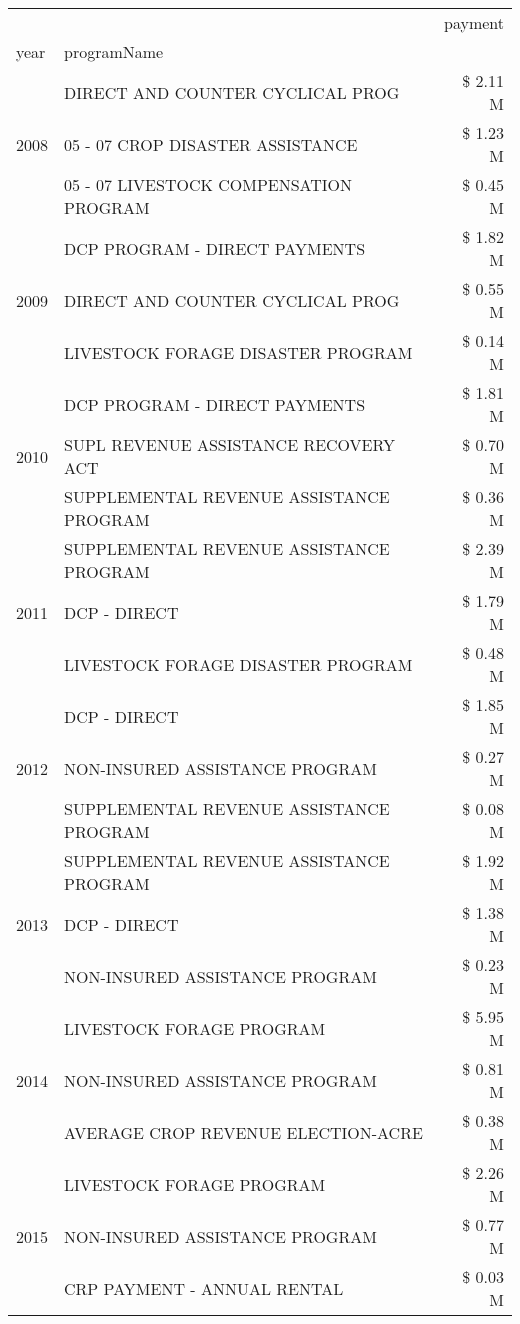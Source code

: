 \begin{tabular}{llr}
\toprule
 &  & payment \\
year & programName &  \\
\midrule
\multirow[t]{3}{*}{2008} & DIRECT AND COUNTER CYCLICAL PROG & \$ 2.11 M \\
 & 05 - 07 CROP DISASTER ASSISTANCE & \$ 1.23 M \\
 & 05 - 07 LIVESTOCK COMPENSATION PROGRAM & \$ 0.45 M \\
\cline{1-3}
\multirow[t]{3}{*}{2009} & DCP PROGRAM - DIRECT PAYMENTS & \$ 1.82 M \\
 & DIRECT AND COUNTER CYCLICAL PROG & \$ 0.55 M \\
 & LIVESTOCK FORAGE DISASTER  PROGRAM & \$ 0.14 M \\
\cline{1-3}
\multirow[t]{3}{*}{2010} & DCP PROGRAM - DIRECT PAYMENTS & \$ 1.81 M \\
 & SUPL REVENUE ASSISTANCE RECOVERY ACT & \$ 0.70 M \\
 & SUPPLEMENTAL REVENUE ASSISTANCE PROGRAM & \$ 0.36 M \\
\cline{1-3}
\multirow[t]{3}{*}{2011} & SUPPLEMENTAL REVENUE ASSISTANCE PROGRAM & \$ 2.39 M \\
 & DCP - DIRECT & \$ 1.79 M \\
 & LIVESTOCK FORAGE DISASTER PROGRAM & \$ 0.48 M \\
\cline{1-3}
\multirow[t]{3}{*}{2012} & DCP - DIRECT & \$ 1.85 M \\
 & NON-INSURED ASSISTANCE PROGRAM & \$ 0.27 M \\
 & SUPPLEMENTAL REVENUE ASSISTANCE PROGRAM & \$ 0.08 M \\
\cline{1-3}
\multirow[t]{3}{*}{2013} & SUPPLEMENTAL REVENUE ASSISTANCE PROGRAM & \$ 1.92 M \\
 & DCP - DIRECT & \$ 1.38 M \\
 & NON-INSURED ASSISTANCE PROGRAM & \$ 0.23 M \\
\cline{1-3}
\multirow[t]{3}{*}{2014} & LIVESTOCK FORAGE PROGRAM & \$ 5.95 M \\
 & NON-INSURED ASSISTANCE PROGRAM & \$ 0.81 M \\
 & AVERAGE CROP REVENUE ELECTION-ACRE & \$ 0.38 M \\
\cline{1-3}
\multirow[t]{3}{*}{2015} & LIVESTOCK FORAGE PROGRAM & \$ 2.26 M \\
 & NON-INSURED ASSISTANCE PROGRAM & \$ 0.77 M \\
 & CRP PAYMENT - ANNUAL RENTAL & \$ 0.03 M \\

\end{tabular}
